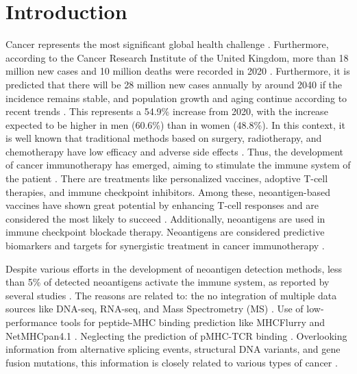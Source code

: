 \section{Introduction}

Cancer represents the most significant global health challenge \cite{siegel2023cancer}. Furthermore, according to the Cancer Research Institute of the United Kingdom, more than 18 million new cases and 10 million deaths were recorded in 2020 \cite{cancerUK2023}. Furthermore, it is predicted that there will be 28 million new cases annually by around 2040 if the incidence remains stable, and population growth and aging continue according to recent trends \cite{cancerUK2023_2}. This represents a 54.9\% increase from 2020, with the increase expected to be higher in men (60.6\%) than in women (48.8\%). In this context, it is well known that traditional methods based on surgery, radiotherapy, and chemotherapy have low efficacy and adverse side effects \cite{peng2019neoantigen}. Thus, the development of cancer immunotherapy has emerged, aiming to stimulate the immune system of the patient \cite{borden2022cancer}. There are treatments like personalized vaccines, adoptive T-cell therapies, and immune checkpoint inhibitors. Among these, neoantigen-based vaccines have shown great potential by enhancing T-cell responses and are considered the most likely to succeed \cite{borden2022cancer}. Additionally, neoantigens are used in immune checkpoint blockade therapy. Neoantigens are considered predictive biomarkers and targets for synergistic treatment in cancer immunotherapy \cite{fang2022neoantigens}.


Despite various efforts in the development of neoantigen detection methods, less than 5\% of detected neoantigens activate the immune system, as reported by several studies \cite{de2020neoantigen, mill2022neoms, bulik2019deep, bassani2015mass, yadav2014predicting}. The reasons are related to: the no integration of multiple data sources like DNA-seq, RNA-seq, and Mass Spectrometry (MS) \cite{kim2018neopepsee}. Use of low-performance tools for peptide-MHC binding prediction like MHCFlurry \cite{o2020mhcflurry} and NetMHCpan4.1 \cite{reynisson2020netmhcpan}. Neglecting the prediction of pMHC-TCR binding \cite{rubinsteyn2018computational}. Overlooking information from alternative splicing events, structural DNA variants, and gene fusion mutations, this information is closely related to various types of cancer \cite{wood2020neoepiscope}.


